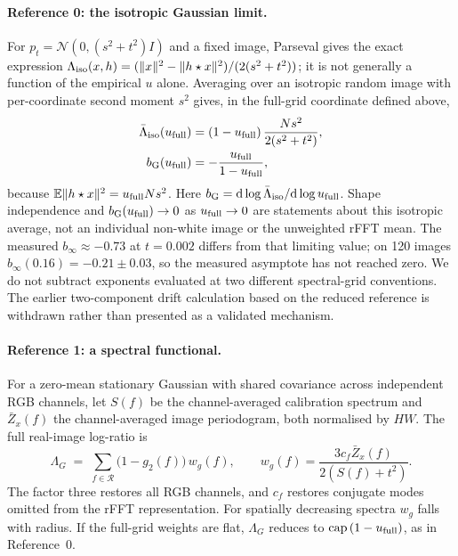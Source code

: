 \documentclass[10pt,journal]{IEEEtran}
\newcommand{\blur}{\star}
\newcommand{\Lam}{\Lambda}
\begin{document}
\paragraph*{Reference 0: the isotropic Gaussian limit.}
For $p_t=\mathcal N(0,(s^2+t^2)I)$ and a fixed image, Parseval gives the exact expression
$\Lam_{\rm iso}(x,h)=(\|x\|^2-\|h\blur x\|^2)/(2(s^2+t^2))$; it is not generally a function of
the empirical $u$ alone. Averaging over an isotropic random image with per-coordinate second
moment $s^2$ gives, in the full-grid coordinate defined above,
\begin{equation}
  \begin{aligned}
  \bar\Lam_{\rm iso}(u_{\rm full}) &= (1-u_{\rm full})\,
  \frac{N s^2}{2(s^2+t^2)},\\
  b_{\rm G}(u_{\rm full}) &=-\frac{u_{\rm full}}{1-u_{\rm full}},
  \end{aligned}
  \label{eq:lgauss}
\end{equation}
because $\mathbb E\|h\blur x\|^2=u_{\rm full}Ns^2$. Here
$b_{\rm G}=\mathrm d\log\bar\Lam_{\rm iso}/\mathrm d\log u_{\rm full}$. Shape independence and
$b_{\rm G}(u_{\rm full})\to0$ as $u_{\rm full}\to0$ are statements about this isotropic average,
not an individual non-white image or the unweighted rFFT mean. The measured
$b_\infty\approx-0.73$ at $t=0.002$ differs from that limiting value; on 120 images
$b_\infty(0.16)=-0.21\pm0.03$, so the measured asymptote has not reached zero. We do not subtract
exponents evaluated at two different spectral-grid conventions. The earlier two-component drift
calculation based on the reduced reference is withdrawn rather than presented as a validated
mechanism.

\paragraph*{Reference 1: a spectral functional.}
For a zero-mean stationary Gaussian with shared covariance across independent RGB channels, let
$S(f)$ be the channel-averaged calibration spectrum and $\bar Z_x(f)$ the channel-averaged image
periodogram, both normalised by $HW$. The full real-image log-ratio is
\begin{equation}
  \Lam_G \;=\; \sum_{f\in\mathcal R}\big(1-g_2(f)\big)\,w_g(f),\qquad
  w_g(f)=\frac{3c_f\bar Z_x(f)}{2(S(f)+t^2)}.
  \label{eq:lamg}
\end{equation}
The factor three restores all RGB channels, and $c_f$ restores conjugate modes omitted from the
rFFT representation. For spatially decreasing spectra $w_g$ falls with radius. If the full-grid
weights are flat, $\Lam_G$ reduces to $\mathrm{cap}\,(1-u_{\rm full})$, as in Reference~0.
\end{document}
